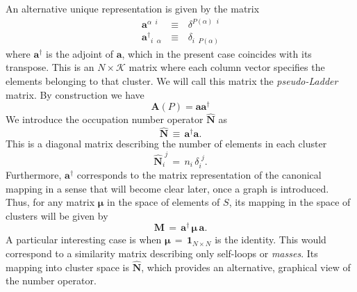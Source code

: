 \documentclass[twocolumn,aps,sort,nofootinbib]{revtex4}
\begin{document}
An alternative
unique representation is given by the matrix
\begin{subequations}
\label{PseudoLadderOperator} 
\begin{eqnarray}
\mathbf{a}^{\alpha\phantom{a} i}\,&\equiv &\,\delta^{P(\alpha) \phantom{a} i} \label{a_matrix} \\
{{\mathbf{a}}^\dagger}_{i\phantom{a} \alpha}\,&\equiv &\,\delta_{i\phantom{a} P(\alpha)} \label{a_matrix}
\end{eqnarray}
\end{subequations}
where ${\mathbf{a}}^\dagger$ is the adjoint of $\mathbf{a}$, which in the present case coincides with its transpose.
This is an $N\times\mathcal{K}$ matrix where each column vector specifies
the elements belonging to that cluster. We will call this matrix the
\textit{pseudo-Ladder} matrix. 
By construction we have 
\begin{equation}
\mathbf{A}(P)=\mathbf{a}{\mathbf{a}}^\dagger
\label{AdjacencyLadder}
\end{equation}
We introduce the occupation number operator $\mathbf{\hat{N}}$ as
\begin{equation}
\mathbf{\hat{N}}\,\equiv\,{\mathbf{a}}^\dagger\mathbf{a}.
\label{NumberOperator}
\end{equation}
This is a diagonal matrix describing the number of elements in 
each cluster 
\begin{equation}
\mathbf{\hat{N}}_i^{\phantom{i} j}\,=\,n_i\,\delta_i^{\phantom{i} j}.
\label{NumberOperatorElements}
\end{equation}
Furthermore, ${\mathbf{a}}^\dagger$ corresponds to the matrix
representation of the canonical mapping in a sense that will 
become clear later, once a graph is introduced. Thus, for any
matrix $\pmb{\mu}$ in the space of elements of $S$, its mapping in
the space of clusters will be given by 
\begin{equation}
\mathbf{M}\,=\,{\mathbf{a}}^\dagger\,\pmb{\mu}\,\mathbf{a}. \label{mu_M}
\end{equation}
A particular interesting case is when $\pmb{\mu}\,=\,\pmb{1}_{N\times N}$ is the identity.
This would correspond to a similarity matrix describing only self-loops or {\sl masses}.
Its mapping into cluster space is  $\mathbf{\hat{N}}$,
which provides an alternative, graphical view of the number operator.
\end{document}
